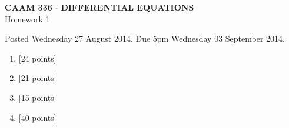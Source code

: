\documentclass[10pt]{article}
\begin{document}
\vspace*{-5em}
\begin{center}
\large \textsf{\textbf{CAAM 336 $\cdot$ DIFFERENTIAL EQUATIONS}\\[0.5em]
Homework 1 }
\end{center}

Posted Wednesday 27 August 2014. Due 5pm Wednesday 03 September 2014.

\begin{enumerate}\addtocounter{enumi}{0}

\item {[24 points]}  

\item {[21 points]}  

\item {[15 points]}  

\item {[40 points]}  


\end{enumerate}
\end{document}
